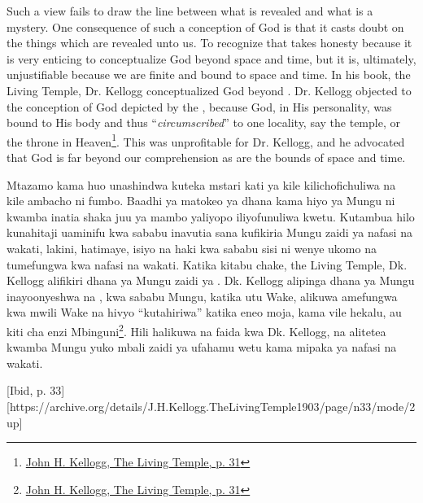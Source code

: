 Such a view fails to draw the line between what is revealed and what is a mystery. One consequence of such a conception of God is that it casts doubt on the things which are revealed unto us. To recognize that takes honesty because it is very enticing to conceptualize God beyond space and time, but it is, ultimately, unjustifiable because we are finite and bound to space and time. In his book, the Living Temple, Dr. Kellogg conceptualized God beyond . Dr. Kellogg objected to the conception of God depicted by the , because God, in His personality, was bound to His body and thus “\textit{circumscribed}” to one locality, say the temple, or the throne in Heaven\footnote{\href{https://archive.org/details/J.H.Kellogg.TheLivingTemple1903/page/n31/mode/2up}{John H. Kellogg, The Living Temple, p. 31}}. This was unprofitable for Dr. Kellogg, and he advocated that God is far beyond our comprehension as are the bounds of space and time.


Mtazamo kama huo unashindwa kuteka mstari kati ya kile kilichofichuliwa na kile ambacho ni fumbo. Baadhi ya matokeo ya dhana kama hiyo ya Mungu ni kwamba inatia shaka juu ya mambo yaliyopo iliyofunuliwa kwetu. Kutambua hilo kunahitaji uaminifu kwa sababu inavutia sana kufikiria Mungu zaidi ya nafasi na wakati, lakini, hatimaye, isiyo na haki kwa sababu sisi ni wenye ukomo na tumefungwa kwa nafasi na wakati. Katika kitabu chake, the Living Temple, Dk. Kellogg alifikiri dhana ya Mungu zaidi ya . Dk. Kellogg alipinga dhana ya Mungu inayoonyeshwa na , kwa sababu Mungu, katika utu Wake, alikuwa amefungwa kwa mwili Wake na hivyo “kutahiriwa” katika eneo moja, kama vile hekalu, au kiti cha enzi Mbinguni\footnote{\href{https://archive.org/details/J.H.Kellogg.TheLivingTemple1903/page/n31/mode/2up}{John H. Kellogg, The Living Temple, p. 31}}. Hili halikuwa na faida kwa Dk. Kellogg, na alitetea kwamba Mungu yuko mbali zaidi ya ufahamu wetu kama mipaka ya nafasi na wakati.


[Ibid, p. 33][https://archive.org/details/J.H.Kellogg.TheLivingTemple1903/page/n33/mode/2up]



